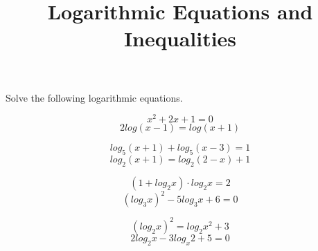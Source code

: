\documentclass[leqno, 11pt]{article}
\begin{document}
\title{Logarithmic Equations and Inequalities}

Solve the following logarithmic equations.\\

\begin{multicols}{2}
  \begin{equation}
	x^2 + 2x + 1 = 0
  \end{equation}\break
  \begin{equation}
    2log(x - 1) = log(x + 1)
  \end{equation}
\end{multicols}


\begin{multicols}{2}
  \begin{equation}
	log_5(x + 1) + log_5(x - 3) = 1
  \end{equation}\break
  \begin{equation}
	log_2(x + 1) = log_2(2 - x) + 1
  \end{equation}
\end{multicols}


\clearpage

\begin{multicols}{2}
  \begin{equation}
	  (1 + log_2x) \cdot log_2x = 2
  \end{equation}\break
  \begin{equation}
	  (log_3x)^2 - 5log_3x + 6 = 0
  \end{equation}
\end{multicols}


\begin{multicols}{2}
  \begin{equation}
	  (log_2x)^2 = log_2x^2 + 3
  \end{equation}\break
  \begin{equation}
	  2log_2x - 3log_x2 + 5 = 0
  \end{equation}
\end{multicols}


\clearpage
\end{document}
